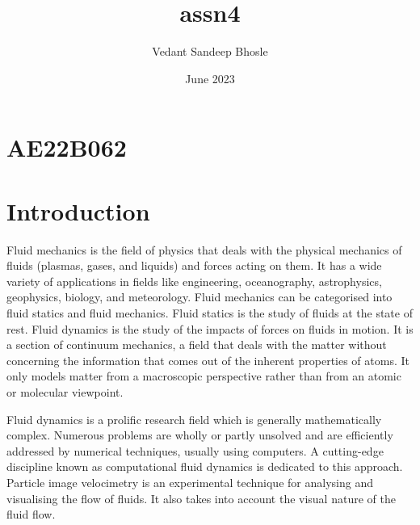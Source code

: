 \documentclass{article}
\title{assn4}
\author{Vedant Sandeep Bhosle}
\date{June 2023}
\begin{document}
\maketitle

\section{AE22B062}
\section{Introduction}
Fluid mechanics is the field of physics that deals with the physical mechanics of fluids (plasmas, gases, and liquids) and forces acting on them. It has a wide variety of applications in fields like engineering, oceanography, astrophysics, geophysics, biology, and meteorology. Fluid mechanics can be categorised into fluid statics and fluid mechanics. Fluid statics is the study of fluids at the state of rest. Fluid dynamics is the study of the impacts of forces on fluids in motion. It is a section of continuum mechanics, a field that deals with the matter without concerning the information that comes out of the inherent properties of atoms. It only models matter from a macroscopic perspective rather than from an atomic or molecular viewpoint.

Fluid dynamics is a prolific research field which is generally mathematically complex. Numerous problems are wholly or partly unsolved and are efficiently addressed by numerical techniques, usually using computers. A cutting-edge discipline known as computational fluid dynamics is dedicated to this approach. Particle image velocimetry is an experimental technique for analysing and visualising the flow of fluids. It also takes into account the visual nature of the fluid flow.
\end{document}
